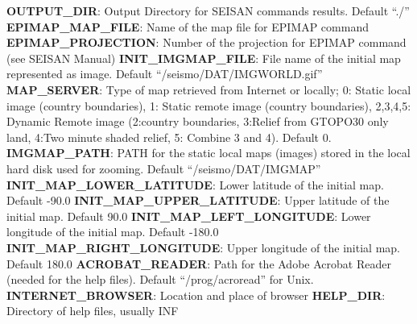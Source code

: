 \noindent
\textbf{OUTPUT\_DIR}: Output Directory for SEISAN commands results. Default ``./'' \newline
\textbf{EPIMAP\_MAP\_FILE}: Name of the map file for EPIMAP command \newline
\textbf{EPIMAP\_PROJECTION}: Number of the projection for EPIMAP command (see SEISAN Manual) \newline
\textbf{INIT\_IMGMAP\_FILE}: File name of the initial map represented as image. Default ``/seismo/DAT/IMGWORLD.gif''\newline
\textbf{MAP\_SERVER}: Type of map retrieved from Internet or locally; 0: Static local image (country boundaries), 1: Static remote image (country boundaries), 2,3,4,5: Dynamic Remote image (2:country boundaries, 3:Relief from GTOPO30 only land, 4:Two minute shaded relief, 5: Combine 3 and 4). Default 0. \newline
\textbf{IMGMAP\_PATH}: PATH for the static local maps (images) stored in the local hard disk used for zooming. Default ``/seismo/DAT/IMGMAP'' \newline
\textbf{INIT\_MAP\_LOWER\_LATITUDE}: Lower latitude of the initial map. Default -90.0 \newline
\textbf{INIT\_MAP\_UPPER\_LATITUDE}: Upper latitude of the initial map. Default 90.0 \newline
\textbf{INIT\_MAP\_LEFT\_LONGITUDE}: Lower longitude of the initial map. Default -180.0 \newline
\textbf{INIT\_MAP\_RIGHT\_LONGITUDE}: Upper longitude of the initial map. Default 180.0 \newline
\textbf{ACROBAT\_READER}: Path for the Adobe Acrobat Reader (needed for the help files). Default ``/prog/acroread'' for Unix. \newline
\textbf{INTERNET\_BROWSER}: Location and place of browser \newline
\textbf{HELP\_DIR}: Directory of help files, usually INF 

